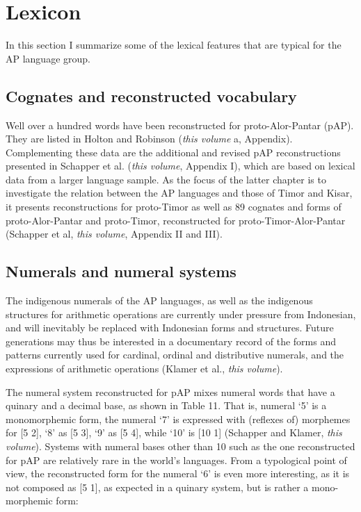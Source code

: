 \section{Lexicon}

In this section I summarize some of the lexical features that are typical for the AP language group.

\subsection{Cognates and reconstructed vocabulary}
Well over a hundred words have been reconstructed for proto-Alor-Pantar (pAP). They are listed in Holton and Robinson (\textit{this volume} a, Appendix). Complementing these data are the additional and revised pAP reconstructions presented in Schapper et al. (\textit{this volume}, Appendix I), which are based on lexical data from a larger language sample. As the focus of the latter chapter is to investigate the relation between the AP languages and those of Timor and Kisar, it presents reconstructions for proto-Timor as well as 89 cognates and forms of proto-Alor-Pantar and proto-Timor, reconstructed for proto-Timor-Alor-Pantar (Schapper et al, \textit{this volume}, Appendix II and III).

\subsection{Numerals and numeral systems}
The indigenous numerals of the AP languages, as well as the indigenous structures for arithmetic operations are currently under pressure from Indonesian, and will inevitably be replaced with Indonesian forms and structures. Future generations may thus be interested in a documentary record of the forms and patterns currently used for cardinal, ordinal and distributive numerals, and the expressions of arithmetic operations (Klamer et al., \textit{this volume}).

The numeral system reconstructed for pAP mixes numeral words that have a quinary and a decimal base, as shown in Table 11. That is, numeral `5' is a monomorphemic form, the numeral `7' is expressed with (reflexes of) morphemes for [5 2], `8' as [5 3], `9' as [5 4], while `10' is [10 1] (Schapper and Klamer, \textit{this volume}). Systems with numeral bases other than 10 such as the one reconstructed for pAP are relatively rare in the world's languages. From a typological point of view, the reconstructed form for the numeral `6' is even more interesting, as it is not composed as [5 1], as expected in a quinary system, but is rather a mono-morphemic form:



